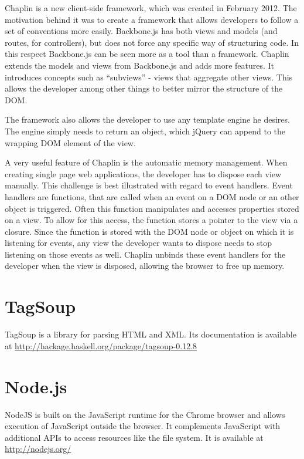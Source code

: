 \documentclass[thesis.tex]{subfiles}
\begin{document}
Chaplin is a new client-side framework, which was created in February 2012.
The motivation behind it was to create a framework that allows developers to
follow a set of conventions more easily. Backbone.js has both views and models
(and routes, for controllers), but does not force any specific way of
structuring code. In this respect Backbone.js can be seen more as a tool than a
framework.
Chaplin extends the models and views from Backbone.js and adds more features.
It introduces concepts such as ``subviews'' - views that aggregate other views.
This allows the developer among other things to better mirror the structure of
the DOM.

The framework also allows the developer to use any template engine he desires.
The engine simply needs to return an object, which jQuery can append to the
wrapping DOM element of the view.

A very useful feature of Chaplin is the automatic memory management.
When creating single page web applications, the developer has to dispose each
view manually. This challenge is best illustrated with regard to event handlers.
Event handlers are functions, that are called when an event on a DOM node or
an other object is triggered. Often this function manipulates and accesses
properties stored on a view. To allow for this access, the function stores a
pointer to the view via a closure. Since the function is stored with the
DOM node or object on which it is listening for events, any view the developer
wants to dispose needs to stop listening on those events as well.
Chaplin unbinds these event handlers for the developer when the view is
disposed, allowing the browser to free up memory.

\section{TagSoup}
\label{app:tagsoup}
TagSoup is a library for parsing HTML and XML. Its documentation is available at
\url{http://hackage.haskell.org/package/tagsoup-0.12.8}

\section{Node.js}
\label{app:nodejs}
NodeJS is built on the JavaScript runtime for the Chrome browser and allows
execution of JavaScript outside the browser. It complements JavaScript with
additional APIs to access resources like the file system.
It is available at \url{http://nodejs.org/}
\end{document}
